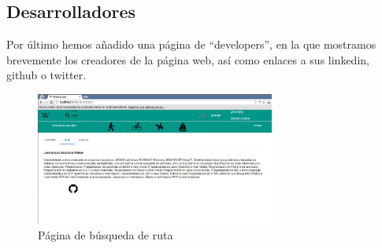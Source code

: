 \documentclass[11pt,a4paper]{article}
\begin{document}
\subsection{Desarrolladores}
Por último hemos añadido una página de ``developers'', en la que mostramos brevemente los creadores de la página web, así como enlaces a sus linkedin, github o twitter.
\begin{figure}[h]
\centering
  \includegraphics[width=0.7\textwidth]{./imagenes/developers}
  \caption{Página de búsqueda de ruta}
  \label{fig: Página de búsqueda de developers}
\end{figure}

\clearpage
\end{document}
